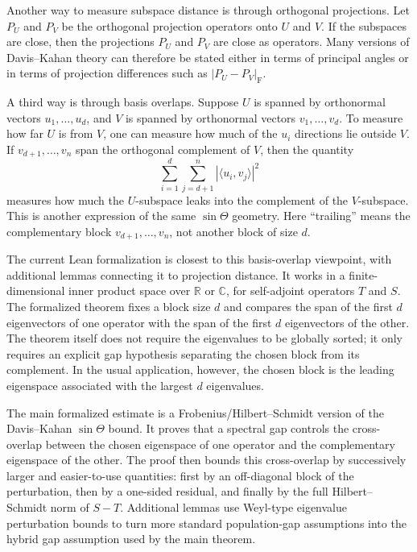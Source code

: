 \documentclass[11pt]{article}
\theoremstyle{remark}
\begin{document}
Another way to measure subspace distance is through orthogonal projections. Let
$P_U$ and $P_V$ be the orthogonal projection operators onto $U$ and $V$. If the
subspaces are close, then the projections $P_U$ and $P_V$ are close as
operators. Many versions of Davis--Kahan theory can therefore be stated either
in terms of principal angles or in terms of projection differences such as
$|P_U-P_V|_{\mathrm F}$.

A third way is through basis overlaps. Suppose $U$ is spanned by orthonormal
vectors $u_1,\dots,u_d$, and $V$ is spanned by orthonormal vectors
$v_1,\dots,v_d$. To measure how far $U$ is from $V$, one can measure how much of
the $u_i$ directions lie outside $V$. If
$v_{d+1},\dots,v_n$ span the orthogonal complement of $V$, then the quantity
\begin{equation}
\sum_{i=1}^d \sum_{j=d+1}^n |\langle u_i, v_j\rangle|^2
\end{equation}
measures how much the $U$-subspace leaks into the complement of the
$V$-subspace. This is another expression of the same $\sin\Theta$ geometry.
Here ``trailing'' means the complementary block $v_{d+1},\dots,v_n$, not another
block of size $d$.

The current Lean formalization is closest to this basis-overlap viewpoint, with
additional lemmas connecting it to projection distance. It works in a
finite-dimensional inner product space over $\mathbb R$ or $\mathbb C$, for
self-adjoint operators $T$ and $S$. The formalized theorem fixes a block size
$d$ and compares the span of the first $d$ eigenvectors of one operator with the
span of the first $d$ eigenvectors of the other. The theorem itself does not
require the eigenvalues to be globally sorted; it only requires an explicit gap
hypothesis separating the chosen block from its complement. In the usual
application, however, the chosen block is the leading eigenspace associated with
the largest $d$ eigenvalues.

The main formalized estimate is a Frobenius/Hilbert--Schmidt version of the
Davis--Kahan $\sin\Theta$ bound. It proves that a spectral gap controls the
cross-overlap between the chosen eigenspace of one operator and the complementary
eigenspace of the other. The proof then bounds this cross-overlap by
successively larger and easier-to-use quantities: first by an off-diagonal block
of the perturbation, then by a one-sided residual, and finally by the full
Hilbert--Schmidt norm of $S-T$. Additional lemmas use Weyl-type eigenvalue
perturbation bounds to turn more standard population-gap assumptions into the
hybrid gap assumption used by the main theorem.
\end{document}
